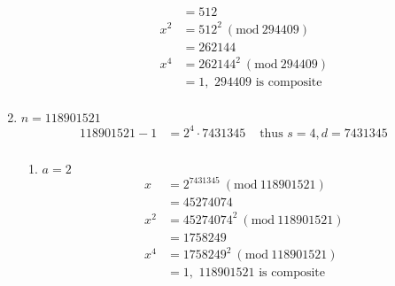 \documentclass{article}
\newcommand{\Mod}[1]{\ (\mathrm{mod}\ #1)}
\begin{document}
\begin{enumerate}[label=(\alph*)]
\begin{enumerate}[label=\arabic*.]
\begin{align*}
                            & = 512                             \\
                        x^2 & = 512^2 \Mod{294409}              \\
                            & = 262144                          \\
                        x^4 & = 262144^2 \Mod{294409}           \\
                            & = 1, \text{ 294409 is composite } \\
                    \end{align*}
          \end{enumerate}
          \addtocounter{enumi}{2}
    \item \(n = 118901521\)
          \begin{align*}
              118901521 - 1 & = 2^4 \cdot 7431345 & \text{ thus } s = 4, d = 7431345 \\
          \end{align*}
          \begin{enumerate}[label=\arabic*.]
              \item \(a = 2\)
                    \begin{align*}
                        x   & = 2^{7431345} \Mod{118901521}        \\
                            & = 45274074                           \\
                        x^2 & = 45274074^2 \Mod{118901521}         \\
                            & = 1758249                            \\
                        x^4 & = 1758249^2 \Mod{118901521}          \\
                            & = 1, \text{ 118901521 is composite } \\
                    \end{align*}
          \end{enumerate}
\end{enumerate}
\end{document}
